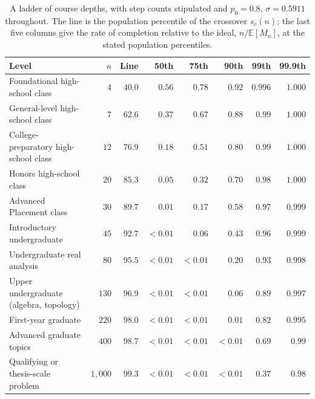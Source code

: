 \documentclass{article}
\begin{document}
\begin{table}[ht]
  \centering
  \caption{A ladder of course depths, with step counts stipulated and $p_0 = 0.8$, $\sigma = 0.5911$ throughout. The line is the population percentile of the crossover $s_c(n)$; the last five columns give the rate of completion relative to the ideal, $n/\mathbb{E}[M_n]$, at the stated population percentiles.}
  \label{tab:course-ladder}
  \medskip\small\setlength{\tabcolsep}{4pt}
  \begin{tabular}{l r r r r r r r}
    \hline
    Level & $n$ & Line & 50th & 75th & 90th & 99th & 99.9th \\
    \hline
    Foundational high-school class & $4$ & $40.0$ & $0.56$ & $0.78$ & $0.92$ & $0.996$ & $1.000$ \\
    General-level high-school class & $7$ & $62.6$ & $0.37$ & $0.67$ & $0.88$ & $0.99$ & $1.000$ \\
    College-preparatory high-school class & $12$ & $76.9$ & $0.18$ & $0.51$ & $0.80$ & $0.99$ & $1.000$ \\
    Honors high-school class & $20$ & $85.3$ & $0.05$ & $0.32$ & $0.70$ & $0.98$ & $1.000$ \\
    Advanced Placement class & $30$ & $89.7$ & $0.01$ & $0.17$ & $0.58$ & $0.97$ & $0.999$ \\
    Introductory undergraduate & $45$ & $92.7$ & $<0.01$ & $0.06$ & $0.43$ & $0.96$ & $0.999$ \\
    Undergraduate real analysis & $80$ & $95.5$ & $<0.01$ & $<0.01$ & $0.20$ & $0.93$ & $0.998$ \\
    Upper undergraduate (algebra, topology) & $130$ & $96.9$ & $<0.01$ & $<0.01$ & $0.06$ & $0.89$ & $0.997$ \\
    First-year graduate & $220$ & $98.0$ & $<0.01$ & $<0.01$ & $0.01$ & $0.82$ & $0.995$ \\
    Advanced graduate topics & $400$ & $98.7$ & $<0.01$ & $<0.01$ & $<0.01$ & $0.69$ & $0.99$ \\
    Qualifying or thesis-scale problem & $1{,}000$ & $99.3$ & $<0.01$ & $<0.01$ & $<0.01$ & $0.37$ & $0.98$ \\
    \hline
  \end{tabular}
\end{table}
\end{document}
